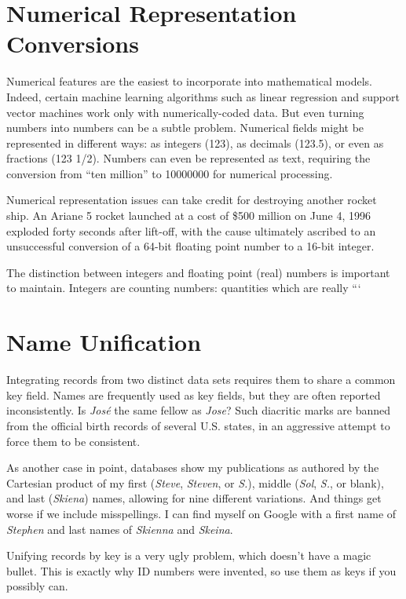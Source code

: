 \documentclass[10pt]{article}
\begin{document}
\section{Numerical Representation Conversions}
Numerical features are the easiest to incorporate into mathematical models. Indeed, certain machine learning algorithms such as linear regression and support vector machines work only with numerically-coded data. But even turning numbers into numbers can be a subtle problem. Numerical fields might be represented in different ways: as integers (123), as decimals (123.5), or even as fractions (123 1/2). Numbers can even be represented as text, requiring the conversion from ``ten million'' to 10000000 for numerical processing.

Numerical representation issues can take credit for destroying another rocket ship. An Ariane 5 rocket launched at a cost of \$500 million on June 4, 1996 exploded forty seconds after lift-off, with the cause ultimately ascribed to an unsuccessful conversion of a 64-bit floating point number to a 16-bit integer.

The distinction between integers and floating point (real) numbers is important to maintain. Integers are counting numbers: quantities which are really
```
\section*{Name Unification}

Integrating records from two distinct data sets requires them to share a common key field. Names are frequently used as key fields, but they are often reported inconsistently. Is \textit{José} the same fellow as \textit{Jose}? Such diacritic marks are banned from the official birth records of several U.S. states, in an aggressive attempt to force them to be consistent.

As another case in point, databases show my publications as authored by the Cartesian product of my first (\textit{Steve}, \textit{Steven}, or \textit{S.}), middle (\textit{Sol}, \textit{S.}, or blank), and last (\textit{Skiena}) names, allowing for nine different variations. And things get worse if we include misspellings. I can find myself on Google with a first name of \textit{Stephen} and last names of \textit{Skienna} and \textit{Skeina}.

Unifying records by key is a very ugly problem, which doesn't have a magic bullet. This is exactly why ID numbers were invented, so use them as keys if you possibly can.
\end{document}
